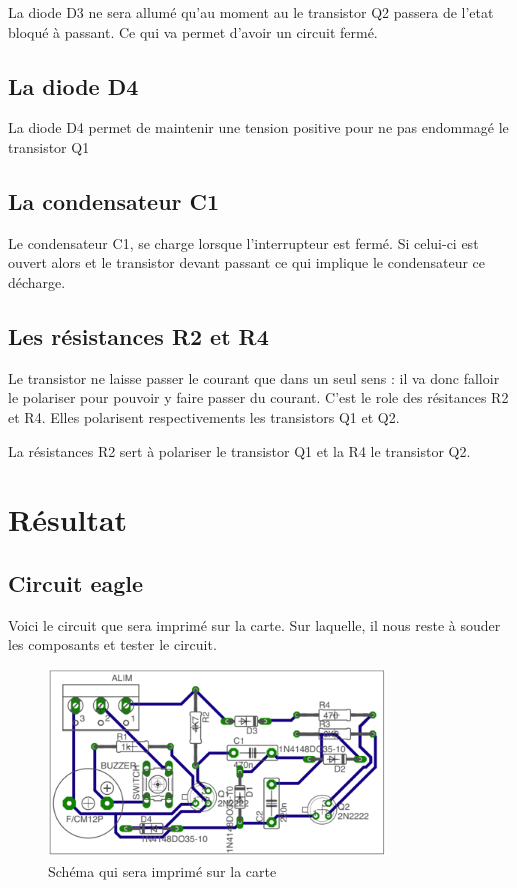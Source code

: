 La diode D3 ne sera allumé qu'au moment au le transistor Q2 passera de l'etat bloqué à passant. Ce qui va permet d'avoir un circuit fermé.

\section{La diode D4}

La diode D4 permet de maintenir une tension positive pour ne pas endommagé le transistor Q1

\section{La condensateur C1}

Le condensateur C1, se charge lorsque l'interrupteur est fermé. Si celui-ci est ouvert alors et le transistor devant passant ce qui implique le condensateur ce décharge.

\section{Les résistances R2 et R4}

Le transistor ne laisse passer le courant que dans un seul sens : il va donc falloir le polariser pour pouvoir y faire passer du courant. C'est le role des résitances R2 et R4. Elles polarisent respectivements les transistors Q1 et Q2.

La résistances R2 sert à polariser le transistor Q1 et la R4 le transistor Q2.

\chapter{Résultat}


\section{Circuit eagle}

Voici le circuit que sera imprimé sur la carte. Sur laquelle, il nous reste à souder les composants et tester le circuit.

\begin{figure}[H]
\centering
\includegraphics[width=0.8\textwidth]{ressources/schemaBoard}
\caption{Schéma qui sera imprimé sur la carte}
\label{schemaBoard}
\end{figure}

